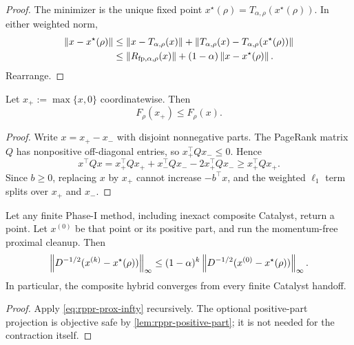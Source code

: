 \begin{proof}
The minimizer is the unique fixed point
$x^\star(\rho)=T_{\alpha,\rho}(x^\star(\rho))$.  In either weighted norm,
\[
\begin{split}
  \left\lVert x-x^\star(\rho)\right\rVert
  &\leq\left\lVert x-T_{\alpha,\rho}(x)\right\rVert
       +\left\lVert T_{\alpha,\rho}(x)-T_{\alpha,\rho}(x^\star(\rho))\right\rVert\\
  &\leq\left\lVert R_{\mathrm{fp},\alpha,\rho}(x)\right\rVert+(1-\alpha)\left\lVert x-x^\star(\rho)\right\rVert.
\end{split}
\]
Rearrange.
\end{proof}

\begin{lemma}
\label{lem:rppr-positive-part}
Let $x_+:=\max\{x,0\}$ coordinatewise.  Then
\begin{equation}
  F_\rho(x_+)\leq F_\rho(x).
  \label{eq:rppr-positive-part}
\end{equation}
\end{lemma}

\begin{proof}
Write $x=x_+-x_-$ with disjoint nonnegative parts.  The PageRank matrix $Q$
has nonpositive off-diagonal entries, so $x_+^\top Qx_-\leq0$.  Hence
\[
  x^\top Qx
  =x_+^\top Qx_++x_-^\top Qx_- -2x_+^\top Qx_-
  \geq x_+^\top Qx_+.
\]
Since $b\geq0$, replacing $x$ by $x_+$ cannot increase $-b^\top x$, and the
weighted $\ell_1$ term splits over $x_+$ and $x_-$.
\end{proof}

\begin{theorem}
\label{thm:rppr-hybrid-convergence}
Let any finite Phase-I method, including inexact composite Catalyst, return a
point.  Let $x^{(0)}$ be that point or its positive part, and run the
momentum-free proximal cleanup.  Then
\begin{equation}
  \left\lVert D^{-1/2}(x^{(k)}-x^\star(\rho))\right\rVert_\infty
  \leq
  (1-\alpha)^k
  \left\lVert D^{-1/2}(x^{(0)}-x^\star(\rho))\right\rVert_\infty.
  \label{eq:rppr-hybrid-convergence}
\end{equation}
In particular, the composite hybrid converges from every finite Catalyst
handoff.
\end{theorem}

\begin{proof}
Apply \cref{eq:rppr-prox-infty} recursively.  The optional positive-part
projection is objective safe by \cref{lem:rppr-positive-part}; it is not
needed for the contraction itself.
\end{proof}

